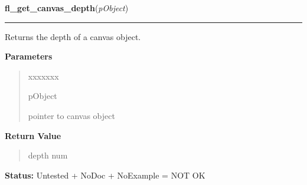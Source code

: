 \hspace{.8\funcindent}\begin{boxedminipage}{\funcwidth}

    \raggedright \textbf{fl\_get\_canvas\_depth}(\textit{pObject})

    \vspace{-1.5ex}

    \rule{\textwidth}{0.5\fboxrule}
\setlength{\parskip}{2ex}
    Returns the depth of a canvas object.

\setlength{\parskip}{1ex}
      \textbf{Parameters}
      \vspace{-1ex}

      \begin{quote}
        \begin{Ventry}{xxxxxxx}

          \item[pObject]

          pointer to canvas object

        \end{Ventry}

      \end{quote}

      \textbf{Return Value}
    \vspace{-1ex}

      \begin{quote}
      depth num

      \end{quote}

\textbf{Status:} Untested + NoDoc + NoExample = NOT OK



    \end{boxedminipage}

    \label{xformslib:library:fl_remove_canvas_handler}

    \vspace{0.5ex}

